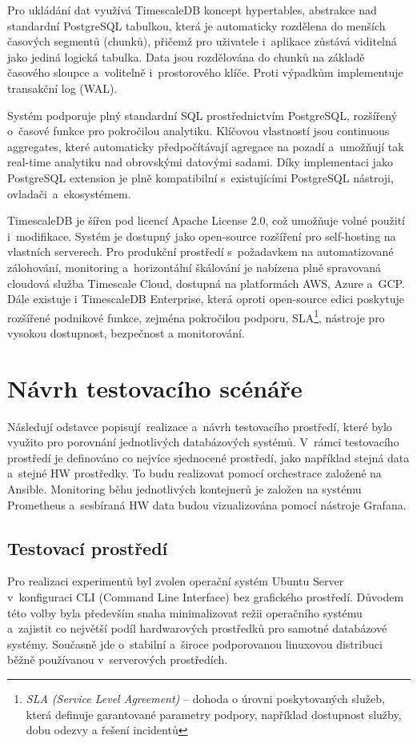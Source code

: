 Pro ukládání dat využívá TimescaleDB koncept hypertables, abstrakce nad standardní PostgreSQL tabulkou, která je automaticky rozdělena do menších časových segmentů (chunků), přičemž pro uživatele i~aplikace zůstává viditelná jako jediná logická tabulka.
Data jsou rozdělována do chunků na základě časového sloupce a~volitelně i~prostorového klíče.
Proti výpadkům implementuje transakční log (WAL).

Systém podporuje plný standardní SQL prostřednictvím PostgreSQL, rozšířený o~časové funkce pro pokročilou analytiku. 
Klíčovou vlastností jsou continuous aggregates, které automaticky předpočítávají agregace na pozadí a~umožňují tak real-time analytiku nad obrovskými datovými sadami. 
Díky implementaci jako PostgreSQL extension je plně kompatibilní s~existujícími PostgreSQL nástroji, ovladači~a~ekosystémem. 
\cite{timescaledbdocs}

TimescaleDB je šířen pod licencí Apache License 2.0, což umožňuje volné použití i~modifikace. 
Systém je dostupný jako open-source rozšíření pro self-hosting na vlastních serverech. 
Pro produkční prostředí s~požadavkem na automatizované zálohování, monitoring a~horizontální škálování je nabízena plně spravovaná cloudová služba Timescale Cloud, dostupná na platformách AWS, Azure a~GCP. 
Dále existuje i TimescaleDB Enterprise, která oproti open-source edici poskytuje rozšířené podnikové funkce, zejména pokročilou podporu, SLA\footnote{\textit{SLA (Service Level Agreement)} – dohoda o úrovni poskytovaných služeb, která definuje garantované parametry podpory, například dostupnost služby, dobu odezvy a řešení incidentů}, nástroje pro vysokou dostupnost, bezpečnost a monitorování.
\cite{timescaledbdocs}

\section{Návrh testovacího scénáře}
Následují odstavce popisují~realizace a~návrh testovacího prostředí, které bylo využito pro porovnání jednotlivých databázových systémů.
V~rámci testovacího prostředí je definováno co nejvíce sjednocené prostředí, jako například stejná data a~stejné HW prostředky.
To budu realizovat pomocí orchestrace založené na Ansible. 
Monitoring běhu jednotlivých kontejnerů je založen na systému Prometheus a~sesbíraná HW data budou vizualizována pomocí nástroje Grafana.

\subsection{Testovací prostředí}
Pro realizaci experimentů byl zvolen operační systém Ubuntu Server v~konfiguraci CLI (Command Line Interface) bez grafického prostředí. 
Důvodem této volby byla především snaha minimalizovat režii operačního systému a~zajistit co největší podíl hardwarových prostředků pro samotné databázové systémy. 
Současně jde o~stabilní a~široce podporovanou linuxovou distribuci běžně používanou v~serverových prostředích.


